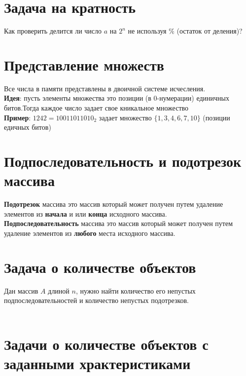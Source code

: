 \documentclass[10pt]{article}
\begin{document}
    \section{Задача на кратность}
    Как проверить делится ли число $a$ на $2^n$ не используя $\%$ (остаток от деления)?
    \\ 
    \section{Представление множеств}
    Все числа в памяти представлены в двоичной системе исчесления.
    \\
    \textbf{Идея}: пусть элементы множества это позиции (в 0-нумерации) единичных битов.Тогда каждое число задает свое кникальное множество
    \\
    \textbf{Пример}: $1242 = 10011011010_2$ задает множество $\{1 , 3 , 4 , 6 , 7 , 10\}$ (позиции едичных битов)
    \section{Подпоследовательность и подотрезок массива}
       \textbf{Подотрезок} массива это массив который может получен путем удаление элементов из \textbf{начала} и или \textbf{конца} исходного массива.
       \vspace{5mm}
       \\
    \textbf{Подпоследовательность} массива это массив который может получен путем удаление элементов из \textbf{любого} места исходного массива.
    
    \section{Задача о количестве объектов}
    
    Дан массив $A$ длиной $n$, нужно найти количество его непустых подпоследовательностей и количество непустых подотрезков.
    \\
    \\
    
    
    \section{Задачи о количестве объектов с заданными храктеристиками}
    
\end{document}
